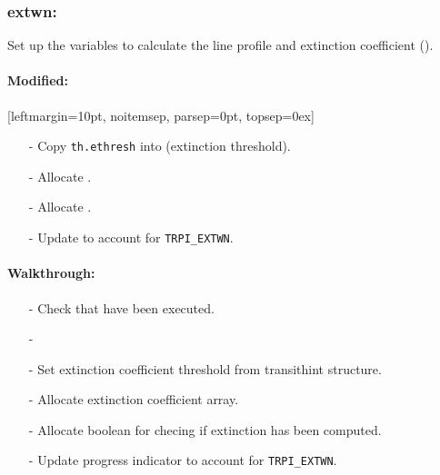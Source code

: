 \documentclass[letterpaper,12pt]{article}
\begin{document}

\subsubsection{extwn:}
Set up the variables to calculate the line profile and extinction
coefficient ().

\paragraph{Modified:}[leftmargin=10pt, noitemsep, parsep=0pt, topsep=0ex]
\begin{enumerate}[leftmargin=10pt, noitemsep, parsep=0pt, topsep=0ex]
\item[-] Copy {\tt th.ethresh} into  (extinction threshold).
\item[-] Allocate .
\item[-] Allocate .
\item[-] Update  to account for {\tt TRPI\_EXTWN}.
\end{enumerate}

\paragraph{Walkthrough:}
\begin{enumerate}[leftmargin=10pt, noitemsep, parsep=0pt, topsep=0ex]
\item[-] Check that  have been executed.
\item[-] 
\item[-] Set extinction coefficient threshold from transithint structure.
\item[-] Allocate extinction coefficient array.
\item[-] Allocate boolean for checing if extinction has been computed.
\item[-] Update progress indicator to account for {\tt TRPI\_EXTWN}.
\end{enumerate}
\end{document}
